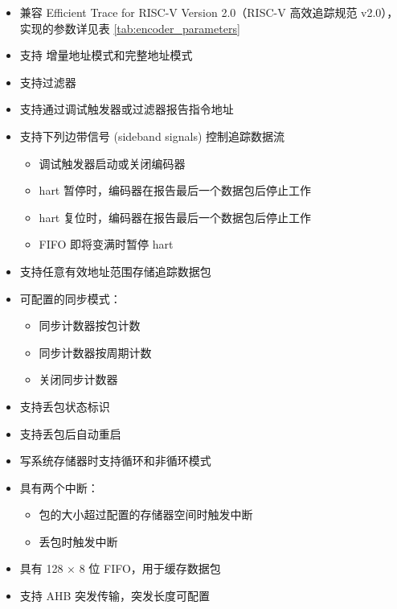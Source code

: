 \documentclass[main\_\_CN.tex]{subfiles}
\begin{document}
\begin{itemize}
    \item 兼容 Efficient Trace for RISC-V Version 2.0（RISC-V 高效追踪规范 v2.0），实现的参数详见表 \ref{tab:encoder_parameters}
    \item 支持 增量地址模式和完整地址模式
    \item 支持过滤器
    \item 支持通过调试触发器或过滤器报告指令地址
    \item 支持下列边带信号 (sideband signals) 控制追踪数据流
        \begin{itemize}
            \item 调试触发器启动或关闭编码器
            \item hart 暂停时，编码器在报告最后一个数据包后停止工作
            \item hart 复位时，编码器在报告最后一个数据包后停止工作
            \item FIFO 即将变满时暂停 hart
        \end{itemize}
    \item 支持任意有效地址范围存储追踪数据包
    \item 可配置的同步模式：
        \begin{itemize}
            \item 同步计数器按包计数
            \item 同步计数器按周期计数
            \item 关闭同步计数器
        \end{itemize}
    \item 支持丢包状态标识
    \item 支持丢包后自动重启
    \item 写系统存储器时支持循环和非循环模式
    \item 具有两个中断：
        \begin{itemize}
            \item 包的大小超过配置的存储器空间时触发中断
            \item 丢包时触发中断
        \end{itemize}
    \item 具有 128 × 8 位 FIFO，用于缓存数据包
    \item 支持 AHB 突发传输，突发长度可配置
\end{itemize}
\end{document}
